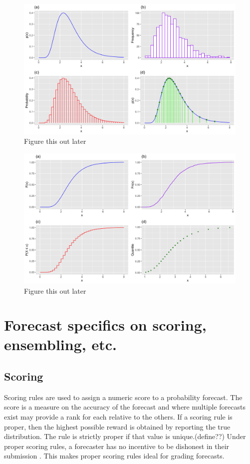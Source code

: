 \documentclass{article}\usepackage[]{graphicx}\usepackage[]{color}
\begin{document}
\begin{figure}[htbp]
\centerline{\includegraphics[scale=.4]{dens_comp.png}}
\caption{Figure this out later}
\label{fig}
\end{figure}

\begin{figure}[htbp]
\centerline{\includegraphics[scale=.4]{cum_comp.png}}
\caption{Figure this out later}
\label{fig}
\end{figure}


	 
\section{Forecast specifics on scoring, ensembling, etc.}

\subsection{Scoring}

Scoring rules are used to assign a numeric score to a probability forecast. The
score is a measure on the accuracy of the forecast and where multiple forecasts
exist may provide a rank for each relative to the others. If a scoring rule is 
proper, then the highest possible reward is obtained by reporting the true 
distribution. The rule is strictly proper if that value is unique.(define??) 
Under proper
scoring rules, a forecaster has no incentive to be dishonest in their 
submission \cite{gneiting2007strictly}. This makes proper scoring rules ideal
for grading forecasts.
\end{document}
